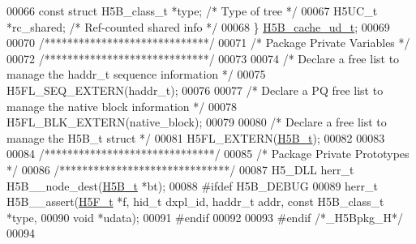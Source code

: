 \begin{DoxyCode}
00066     \textcolor{keyword}{const} \textcolor{keyword}{struct }H5B\_class\_t *type;     \textcolor{comment}{/* Type of tree              */}
00067     H5UC\_t *rc\_shared;                  \textcolor{comment}{/* Ref-counted shared info       */}
00068 \} \hyperlink{struct_h5_b__cache__ud__t}{H5B\_cache\_ud\_t};
00069 
00070 \textcolor{comment}{/*****************************/}
00071 \textcolor{comment}{/* Package Private Variables */}
00072 \textcolor{comment}{/*****************************/}
00073 
00074 \textcolor{comment}{/* Declare a free list to manage the haddr\_t sequence information */}
00075 H5FL\_SEQ\_EXTERN(haddr\_t);
00076 
00077 \textcolor{comment}{/* Declare a PQ free list to manage the native block information */}
00078 H5FL\_BLK\_EXTERN(native\_block);
00079 
00080 \textcolor{comment}{/* Declare a free list to manage the H5B\_t struct */}
00081 H5FL\_EXTERN(\hyperlink{struct_h5_b__t}{H5B\_t});
00082 
00083 
00084 \textcolor{comment}{/******************************/}
00085 \textcolor{comment}{/* Package Private Prototypes */}
00086 \textcolor{comment}{/******************************/}
00087 H5\_DLL herr\_t H5B\_\_node\_dest(\hyperlink{struct_h5_b__t}{H5B\_t} *bt);
00088 \textcolor{preprocessor}{#ifdef H5B\_DEBUG}
00089 herr\_t H5B\_\_assert(\hyperlink{struct_h5_f__t}{H5F\_t} *f, hid\_t dxpl\_id, haddr\_t addr, \textcolor{keyword}{const} H5B\_class\_t *type,
00090              \textcolor{keywordtype}{void} *udata);
00091 \textcolor{preprocessor}{#endif}
00092 
00093 \textcolor{preprocessor}{#endif }\textcolor{comment}{/*\_H5Bpkg\_H*/}\textcolor{preprocessor}{}
00094 
\end{DoxyCode}
